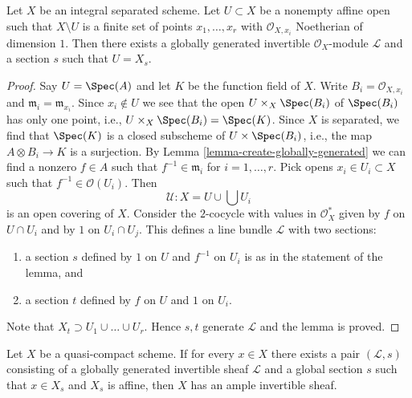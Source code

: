 \begin{lemma}
\label{lemma-find-globally-generated}
Let $X$ be an integral separated scheme. Let $U \subset X$ be a nonempty
affine open such that $X \setminus U$ is a finite set of points
$x_1, \ldots, x_r$ with $\mathcal{O}_{X, x_i}$ Noetherian of dimension $1$.
Then there exists a globally generated invertible $\mathcal{O}_X$-module
$\mathcal{L}$ and a section $s$ such that $U = X_s$.
\end{lemma}

\begin{proof}
Say $U = \Spec(A)$ and let $K$ be the function field of $X$.
Write $B_i = \mathcal{O}_{X, x_i}$ and $\mathfrak m_i = \mathfrak m_{x_i}$.
Since $x_i \not \in U$ we see that the open
$U \times_X \Spec(B_i)$ of $\Spec(B_i)$ has only one point, i.e.,
$U \times_X \Spec(B_i) = \Spec(K)$.
Since $X$ is separated, we find that $\Spec(K)$ is a closed subscheme
of $U \times \Spec(B_i)$, i.e., the map $A \otimes B_i \to K$ is a surjection.
By Lemma \ref{lemma-create-globally-generated} we can find a nonzero
$f \in A$ such that $f^{-1} \in \mathfrak m_i$ for $i = 1, \ldots, r$.
Pick opens $x_i \in U_i \subset X$ such that $f^{-1} \in \mathcal{O}(U_i)$.
Then
$$
\mathcal{U} : X = U \cup \bigcup U_i
$$
is an open covering of $X$. Consider the $2$-cocycle with values
in $\mathcal{O}_X^*$ given by $f$ on $U \cap U_i$ and by
$1$ on $U_i \cap U_j$. This defines a line bundle $\mathcal{L}$
with two sections:
\begin{enumerate}
\item a section $s$ defined by $1$ on $U$
and $f^{-1}$ on $U_i$ is as in the statement of the lemma, and
\item a section $t$ defined by $f$ on $U$ and
$1$ on $U_i$.
\end{enumerate}
Note that $X_t \supset U_1 \cup \ldots \cup U_r$.
Hence $s, t$ generate $\mathcal{L}$ and the lemma is proved.
\end{proof}

\begin{lemma}
\label{lemma-enough-globally-generated-ample}
Let $X$ be a quasi-compact scheme. If for every $x \in X$
there exists a pair $(\mathcal{L}, s)$ consisting of a globally generated
invertible sheaf $\mathcal{L}$ and a global section $s$ such that
$x \in X_s$ and $X_s$ is affine, then $X$ has an ample invertible
sheaf.
\end{lemma}

